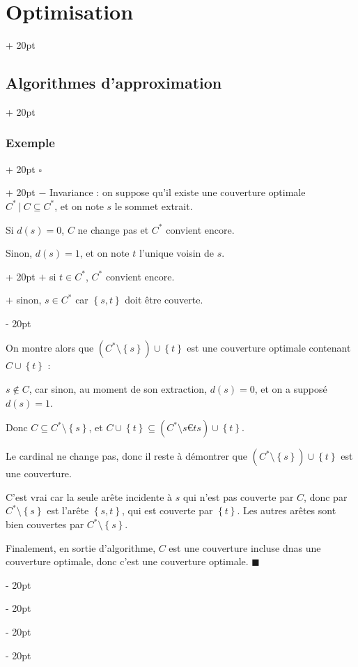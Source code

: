 \documentclass[a4paper, 12pt, twoside]{article}
\newcommand{\lr}[1]{\left( #1 \right)}
\newcommand{\set}[1]{\left\{ #1 \right\}}
\newcommand{\ind}[1][20pt]{\advance\leftskip + #1}
\newcommand{\deind}[1][20pt]{\advance\leftskip - #1}
\newenvironment{indt}[2][20pt]{#2 \par \ind[#1]}{\par \deind} %
\newenvironment{proof}[1][{}]{\begin{indt}{$\square$ #1}}{$\blacksquare$ \end{indt}}
\newcommand{\1}{\mathbbm 1}
\begin{document}
\begin{indt}{\section{Optimisation}}
\begin{indt}{\subsection{Algorithmes d'approximation}}
\begin{indt}{\subsubsection{Exemple}}
\begin{proof}
                    $-$ Invariance : on suppose qu'il existe une couverture optimale $C^*\ |\ C \subseteq C^*$, et on note $s$ le sommet extrait.

                    Si $d(s) = 0$, $C$ ne change pas et $C^*$ convient encore.

                    \begin{indt}{Sinon, $d(s) = 1$, et on note $t$ l'unique voisin de $s$.}
                        $+$ si $t \in C^*$, $C^*$ convient encore.

                        $+$ sinon, $s \in C^*$ car $\set{s, t}$ doit être couverte.
                    \end{indt}

                    On montre alors que $\lr{C^* \setminus \set s} \cup \set t$ est une couverture optimale contenant $C \cup \set t$ :

                    $s \notin C$, car sinon, au moment de son extraction, $d(s) = 0$, et on a supposé $d(s) = 1$.

                    Donc $C \subseteq C^* \setminus \set s$, et $C \cup \set t \subseteq \lr{C^* \setminus s€t s} \cup \set t$.

                    Le cardinal ne change pas, donc il reste à démontrer que $\lr{C^* \setminus \set s} \cup \set t$ est une couverture.

                    C'est vrai car la seule arête incidente à $s$ qui n'est pas couverte par $C$, donc par $C^* \setminus \set s$ est l'arête $\set{s, t}$, qui est couverte par $\set t$. Les autres arêtes sont bien couvertes par $C^* \setminus \set s$.

                    Finalement, en sortie d'algorithme, $C$ est une couverture incluse dnas une couverture optimale, donc c'est une couverture optimale.
                \end{proof}
            \end{indt}
        \end{indt}
    \end{indt}
    
\end{document}
